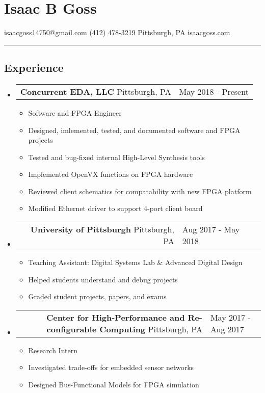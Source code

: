 \documentclass[18pt]{article}
\makeatletter
\providecommand{\tightlist}{
    \setlength{\itemsep}{0pt}\setlength{\parskip}{0pt}
}
\providecommand{\datetable}[2]{
    \begin{tabular*}{\textwidth}{@{}r @{\extracolsep{\fill}} l}
        #1 & #2
    \end{tabular*}
}
\makeatother
\begin{document}
    \section*{Isaac B Goss}\label{isaac-b-goss}
    isaacgoss14750@gmail.com \textbar{} (412) 478-3219 \textbar{} Pittsburgh, PA \textbar{} isaacgoss.com
    
    \hrule

    \subsection*{Experience}\label{experience}
    \begin{itemize}[label={}]

        \item \datetable{
            \textbf{Concurrent EDA, LLC} \textbar{} Pittsburgh, PA
        }{May 2018 - Present}
        \begin{itemize}[topsep=0pt]\tightlist
            \item Software and FPGA Engineer
            \item Designed, imlemented, tested, and documented software and FPGA projects
            \item Tested and bug-fixed internal High-Level Synthesis tools
            \item Implemented OpenVX functions on FPGA hardware
            \item Reviewed client schematics for compatability with new FPGA platform
            \item Modified Ethernet driver to support 4-port client board
        \end{itemize}

        \item \datetable{
            \textbf{University of Pittsburgh} \textbar{} Pittsburgh, PA
        }{Aug 2017 - May 2018}
        \begin{itemize}[topsep=0pt]\tightlist
            \item Teaching Assistant: Digital Systems Lab \& Advanced Digital Design
            \item Helped students understand and debug projects
            \item Graded student projects, papers, and exams
        \end{itemize}

        \item \datetable{
            \textbf{Center for High-Performance and Re-configurable Computing} \textbar{} Pittsburgh, PA
        }{May 2017 - Aug 2017}
        \begin{itemize}[topsep=0pt]\tightlist
            \item Research Intern
            \item Investigated trade-offs for embedded sensor networks
            \item Designed Bus-Functional Models for FPGA simulation
      	\end{itemize}

    \end{itemize}
\end{document}
